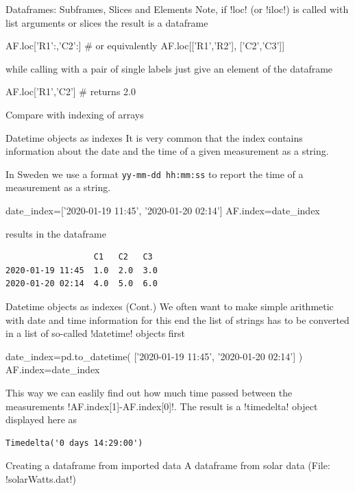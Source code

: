 \documentclass[hyperref={pdfpagelabels=false},table]{beamer}
\begin{document}
\begin{frame}[fragile]{Dataframes: Subframes, Slices and Elements}
Note, if \pyth!loc! (or \pyth!iloc!) is called with list arguments or slices  the result is
a dataframe
\begin{python}
AF.loc['R1':,'C2':]  # or equivalently
AF.loc[['R1','R2'], ['C2','C3']]
\end{python}
\vfill
while calling with a pair of single labels just give an element of the dataframe
\begin{python}
AF.loc['R1','C2']  # returns 2.0
\end{python}
\vfill
{\tiny Compare with indexing of arrays}
\end{frame}
\begin{frame}[fragile]{Datetime objects as indexes}
It is very common that the index contains information about the date and the time of a given measurement
as a string.

In Sweden we use a format \texttt{yy-mm-dd hh:mm:ss} to report the time of a measurement as a string.

\begin{python}
date_index=['2020-01-19 11:45', '2020-01-20 02:14']
AF.index=date_index
\end{python}
\vfill
results in the dataframe
\vfill
\begin{verbatim}
                  C1   C2   C3
2020-01-19 11:45  1.0  2.0  3.0
2020-01-20 02:14  4.0  5.0  6.0
\end{verbatim}
\end{frame}
\begin{frame}[fragile]{Datetime objects as indexes \hfill (Cont.)}
We often want to make simple arithmetic with date and time information for this end
the list of strings has to be converted in a list of so-called \pyth!datetime! objects first
\vfill
\begin{python}
date_index=pd.to_datetime(
           ['2020-01-19 11:45', '2020-01-20 02:14']
           )
AF.index=date_index
\end{python}
\vfill
This way we can easlily find out how much time passed between the measurements
\pyth!AF.index[1]-AF.index[0]!.
The result is a \pyth!timedelta! object displayed here as
\begin{verbatim}
Timedelta('0 days 14:29:00')
\end{verbatim}
\end{frame}
\begin{frame}[fragile]{Creating a dataframe from imported data}
A dataframe from solar data (File: \pyth!solarWatts.dat!)
\end{frame}
\end{document}
